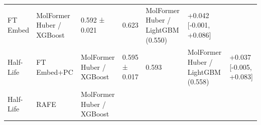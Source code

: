 \documentclass[
  10pt,
]{article}
\begin{document}
\begin{longtable}[]{@{}lllllll@{}}
\begin{minipage}[t]{0.12\columnwidth}
FT Embed\strut
\end{minipage} & \begin{minipage}[t]{0.12\columnwidth}\raggedright
MolFormer Huber / XGBoost\strut
\end{minipage} & \begin{minipage}[t]{0.12\columnwidth}\raggedright
0.592 ± 0.021\strut
\end{minipage} & \begin{minipage}[t]{0.12\columnwidth}\raggedright
0.623\strut
\end{minipage} & \begin{minipage}[t]{0.12\columnwidth}\raggedright
MolFormer Huber / LightGBM (0.550)\strut
\end{minipage} & \begin{minipage}[t]{0.12\columnwidth}\raggedright
+0.042 {[}-0.001, +0.086{]}\strut
\end{minipage}\tabularnewline
\begin{minipage}[t]{0.12\columnwidth}\raggedright
Half-Life\strut
\end{minipage} & \begin{minipage}[t]{0.12\columnwidth}\raggedright
FT Embed+PC\strut
\end{minipage} & \begin{minipage}[t]{0.12\columnwidth}\raggedright
MolFormer Huber / XGBoost\strut
\end{minipage} & \begin{minipage}[t]{0.12\columnwidth}\raggedright
0.595 ± 0.017\strut
\end{minipage} & \begin{minipage}[t]{0.12\columnwidth}\raggedright
0.593\strut
\end{minipage} & \begin{minipage}[t]{0.12\columnwidth}\raggedright
MolFormer Huber / LightGBM (0.558)\strut
\end{minipage} & \begin{minipage}[t]{0.12\columnwidth}\raggedright
+0.037 {[}-0.005, +0.083{]}\strut
\end{minipage}\tabularnewline
\begin{minipage}[t]{0.12\columnwidth}\raggedright
Half-Life\strut
\end{minipage} & \begin{minipage}[t]{0.12\columnwidth}\raggedright
RAFE\strut
\end{minipage} & \begin{minipage}[t]{0.12\columnwidth}\raggedright
MolFormer Huber / XGBoost\strut

\end{minipage}
\end{longtable}
\end{document}
